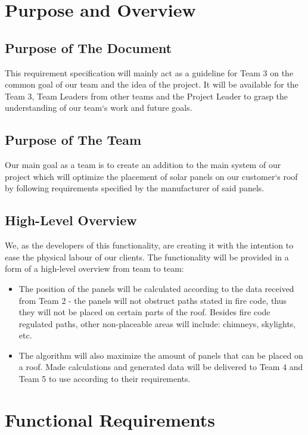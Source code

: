 \documentclass[a4paper,12pt,fleqn]{article}
\begin{document}
\newpage
\section{Purpose and Overview}

\subsection{Purpose of The Document}

This requirement specification will mainly act as a guideline for Team 3 on the common goal of our team and the idea of the project. It will be available for the Team 3, Team Leaders from other teams and the Project Leader to grasp the understanding of our team‘s work and future goals. 

\subsection{Purpose of The Team}
Our main goal as a team is to create an addition to the main system of our project which will optimize the placement of solar panels on our customer‘s roof by following requirements specified by the manufacturer of said panels. 

\subsection{High-Level Overview}
We, as the developers of this functionality, are creating it with the intention to ease the physical labour of our clients. The functionality will be provided in a form of a high-level overview from team to team: 

\begin{itemize}
    \item The position of the panels will be calculated according to the data received from Team 2 - the panels will not obstruct paths stated in fire code, thus they will not be placed on certain parts of the roof. Besides fire code regulated paths, other non-placeable areas will include: chimneys, skylights, etc.
    
    \item The algorithm will also maximize the amount of panels that can be placed on a roof. Made calculations and generated data will be delivered to Team 4 and Team 5 to use according to their requirements. 
\end{itemize}

\newpage

\section{Functional Requirements}
\end{document}
